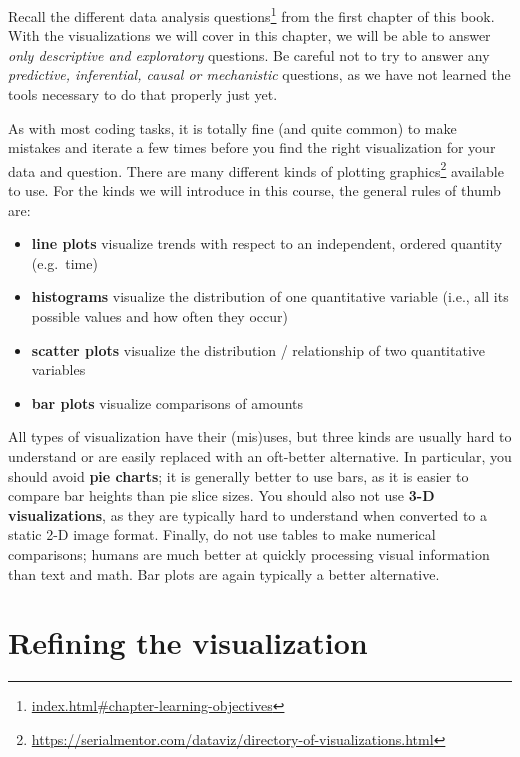 \documentclass[
]{krantz}
\providecommand{\tightlist}{%
  \setlength{\itemsep}{0pt}\setlength{\parskip}{0pt}}
\renewcommand{\href}[2]{#2\footnote{\url{#1}}}
\begin{document}
Recall \href{index.html\#chapter-learning-objectives}{the different data analysis questions} from the first chapter of this book. With the visualizations
we will cover in this chapter, we will be able to answer \emph{only descriptive and exploratory} questions. Be careful not to try to answer any \emph{predictive, inferential, causal or mechanistic}
questions, as we have not learned the tools necessary to do that properly just yet.

As with most coding tasks, it is totally fine (and quite common) to make mistakes and iterate a few times before you find
the right visualization for your data and question. There are \href{https://serialmentor.com/dataviz/directory-of-visualizations.html}{many different kinds of plotting graphics} available
to use. For the kinds we will introduce in this course, the general rules of thumb are:

\begin{itemize}
\tightlist
\item
  \textbf{line plots} visualize trends with respect to an independent, ordered quantity (e.g.~time)
\item
  \textbf{histograms} visualize the distribution of one quantitative variable (i.e., all its possible values and how often they occur)
\item
  \textbf{scatter plots} visualize the distribution / relationship of two quantitative variables
\item
  \textbf{bar plots} visualize comparisons of amounts
\end{itemize}

All types of visualization have their (mis)uses, but three kinds are usually hard to understand or are easily replaced with an oft-better alternative.
In particular, you should avoid \textbf{pie charts}; it is generally better to use bars, as it is easier to compare bar heights than pie slice sizes.
You should also not use \textbf{3-D visualizations}, as they are typically hard to understand when converted to a static 2-D image format. Finally,
do not use tables to make numerical comparisons; humans are much better at quickly processing visual information than text and math. Bar plots are
again typically a better alternative.

\hypertarget{refining-the-visualization}{%
\section{Refining the visualization}\label{refining-the-visualization}}
\end{document}
